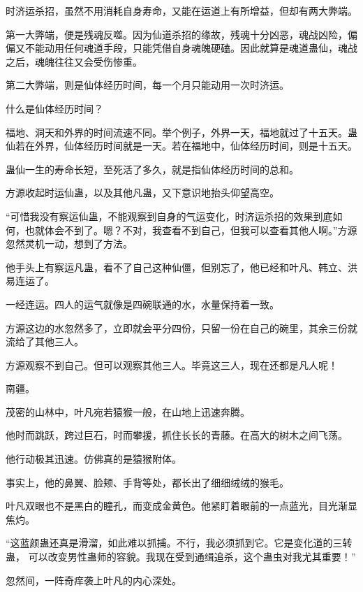 
\begin{this_body}

时济运杀招，虽然不用消耗自身寿命，又能在运道上有所增益，但却有两大弊端。

第一大弊端，便是残魂反噬。因为仙道杀招的缘故，残魂十分凶恶，魂战凶险，偏偏又不能动用任何魂道手段，只能凭借自身魂魄硬磕。因此就算是魂道蛊仙，魂战之后，魂魄往往又会受伤惨重。

第二大弊端，则是仙体经历时间，每一个月只能动用一次时济运。

什么是仙体经历时间？

福地、洞天和外界的时间流速不同。举个例子，外界一天，福地就过了十五天。蛊仙若在外界，仙体经历时间就是一天。若在福地中，仙体经历时间，则是十五天。

蛊仙一生的寿命长短，至死活了多久，就是指仙体经历时间的总和。

方源收起时运仙蛊，以及其他凡蛊，又下意识地抬头仰望高空。

“可惜我没有察运仙蛊，不能观察到自身的气运变化，时济运杀招的效果到底如何，也就体会不到了。嗯？不对，我查看不到自己，但我可以查看其他人啊。”方源忽然灵机一动，想到了方法。

他手头上有察运凡蛊，看不了自己这种仙僵，但别忘了，他已经和叶凡、韩立、洪易连运了。

一经连运。四人的运气就像是四碗联通的水，水量保持着一致。

方源这边的水忽然多了，立即就会平分四份，只留一份在自己的碗里，其余三份就流给了其他三人。

方源观察不到自己。但可以观察其他三人。毕竟这三人，现在还都是凡人呢！

南疆。

茂密的山林中，叶凡宛若猿猴一般，在山地上迅速奔腾。

他时而跳跃，跨过巨石，时而攀援，抓住长长的青藤。在高大的树木之间飞荡。

他行动极其迅速。仿佛真的是猿猴附体。

事实上，他的鼻翼、脸颊、手背等处，都长出了细细绒绒的猴毛。

叶凡双眼也不是黑白的瞳孔，而变成金黄色。他紧盯着眼前的一点蓝光，目光渐显焦灼。

“这蓝颜蛊还真是滑溜，如此难以抓捕。不行，我必须抓到它。它是变化道的三转蛊， 可以改变男性蛊师的容貌。我现在受到通缉追杀，这个蛊虫对我尤其重要！”

忽然间，一阵奇痒袭上叶凡的内心深处。


\end{this_body}
